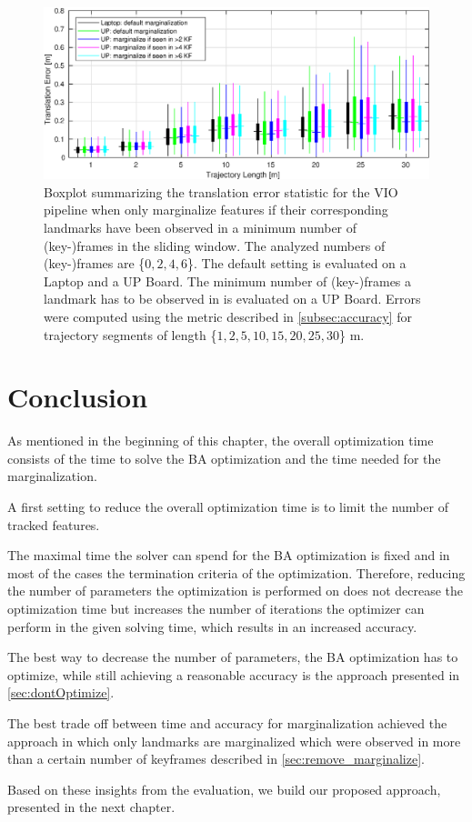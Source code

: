 \begin{figure}[H]
\centering
\includegraphics[width=1\textwidth]{images/acc_marginalize}
\caption{Boxplot summarizing the translation error statistic for the \ac{VIO}
pipeline when only marginalize features if their corresponding landmarks have 
been observed in a minimum 
number of (key-)frames in the sliding window. The analyzed numbers of 
(key-)frames are \{$0, 2, 4, 6$\}. The default setting is evaluated on a Laptop 
and a UP Board. The minimum number of (key-)frames a landmark has to be 
observed in is evaluated on a UP Board. Errors were computed 
using the metric described in \autoref{subsec:accuracy} 
for trajectory segments of length \{$1, 2, 5, 10, 15, 20, 25, 30$\} m.}
\label{fig:acc_marginalize}
\end{figure} 
\newpage

\section{Conclusion}\label{sec:eval_conclusion}
As mentioned in the beginning of this chapter, the overall optimization time 
consists of the time to solve the \ac{BA} 
optimization and the time needed for the marginalization.

A first setting to reduce the overall optimization time is to limit the number 
of tracked features. 

The maximal time the 
solver can spend for the \ac{BA} optimization is fixed and in most of the cases 
the termination criteria of the 
optimization. Therefore, reducing the number of parameters the optimization is 
performed on does not decrease the optimization time but increases the number 
of iterations the optimizer can perform in the given solving time, which 
results in an increased accuracy.

The best way to decrease the number of parameters, the \ac{BA} optimization has 
to optimize, while still achieving a reasonable accuracy is the approach 
presented in \autoref{sec:dontOptimize}.

The best trade off between time and accuracy for marginalization achieved the 
approach in which only landmarks are marginalized which were observed in more 
than a certain number of keyframes described in 
\autoref{sec:remove_marginalize}.

Based on these insights from the evaluation, we build our proposed approach, 
presented in the next chapter.